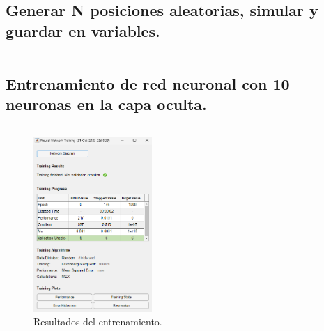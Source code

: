 \documentclass[a4paper, 12pt]{article}
\begin{document}
	\subsection{Generar N posiciones aleatorias, simular y guardar en variables.}
		\inputminted[fontsize=\scriptsize, linenos, breaklines=true, xleftmargin=0.75cm, frame=lines]{matlab}{code/parte2/EjerE.m}
		
	\subsection{Entrenamiento de red neuronal con 10 neuronas en la capa oculta.}
		\inputminted[fontsize=\scriptsize, linenos, breaklines=true, xleftmargin=0.75cm, frame=lines]{matlab}{code/parte2/EjerF.m}
		
		\begin{figure}[htp!]
			\centering
			\includegraphics[width=0.4\textwidth]{figures/parte2/ejerF.png}
			\caption{Resultados del entrenamiento.}
		\end{figure}
\end{document}
